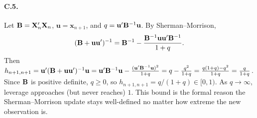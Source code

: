 \documentclass{article}
\begin{document}
\paragraph{C.5.}  Let ${\mathbf B} = {\mathbf X}_n'{\mathbf X}_n$, $\bm u = \bm x_{n+1}$, and $q = \mathbf u'{\mathbf B}^{-1}\mathbf u$.  By Sherman--Morrison,
$$({\mathbf B} + \mathbf u\mathbf u')^{-1} = {\mathbf B}^{-1} - \frac{{\mathbf B}^{-1}\mathbf u\mathbf u'{\mathbf B}^{-1}}{1 + q}.$$
Then $h_{n+1, n+1} = \mathbf u'({\mathbf B} + \mathbf u\mathbf u')^{-1}\mathbf u = \mathbf u'{\mathbf B}^{-1}\mathbf u - \frac{(\mathbf u'{\mathbf B}^{-1}\mathbf u)^2}{1 + q} = q - \frac{q^2}{1+q} = \frac{q(1+q) - q^2}{1 + q} = \frac{q}{1 + q}$.  Since ${\mathbf B}$ is positive definite, $q \geq 0$, so $h_{n+1, n+1} = q/(1+q) \in [0, 1)$.  As $q \to\infty$, leverage approaches (but never reaches) $1$.  This bound is the formal reason the Sherman--Morrison update stays well-defined no matter how extreme the new observation is.
\end{document}
